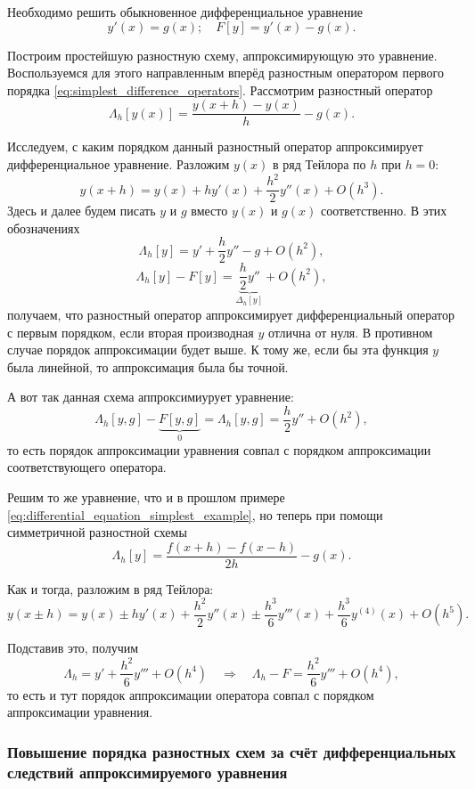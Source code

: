 \documentclass[../main.tex]{subfile}
\begin{document}
\begin{example}\label{eq:differential_equation_simplest_example}
	Необходимо решить обыкновенное дифференциальное уравнение
	\[y'(x)=g(x);\quad F[y]=y'(x)-g(x).\]

	Построим простейшую разностную схему, аппроксимирующую это уравнение.
	Воспользуемся для этого направленным вперёд разностным оператором
	первого порядка \eqref{eq:simplest_difference_operators}. Рассмотрим
	разностный оператор
	\[\Lambda_h[y(x)]=\frac{y(x+h)-y(x)}{h}-g(x).\]

	Исследуем, с каким порядком данный разностный оператор аппроксимирует
	дифференциальное уравнение. Разложим $y(x)$ в ряд Тейлора по $h$ при
	$h=0$:
	\[y(x+h)=y(x)+hy'(x)+\frac{h^2}{2}y''(x)+O(h^3).\]
	Здесь и далее будем писать $y$ и $g$ вместо $y(x)$ и $g(x)$
	соответственно. В этих обозначениях
	\[\Lambda_h[y]=y'+\frac{h}{2}y''-g+O(h^2),\]
	\[\Lambda_h[y]-F[y]=\underset{\Delta_h[y]}{\underbrace{\frac{h}{2}y''}}
	+O(h^2),\]
	получаем, что разностный оператор аппроксимирует дифференциальный
	оператор с первым порядком, если вторая производная $y$ отлична от нуля.
	В противном случае порядок аппроксимации будет выше. К тому же, если бы
	эта функция $y$ была линейной, то аппроксимация была бы точной.

	А вот так данная схема аппроксимиурует уравнение:
	\[\Lambda_h[y,g]-\underset{0}{\underbrace{F[y,g]}}=\Lambda_h[y,g]=
	\frac{h}{2}y''+O(h^2),\]
	то есть порядок аппроксимации уравнения совпал с порядком аппроксимации
	соответствующего оператора.
\end{example}

\begin{example}\label{eq:differential_equation_central_example}
	Решим то же уравнение, что и в прошлом примере
	\eqref{eq:differential_equation_simplest_example}, но теперь при помощи
	симметричной разностной схемы
	\[\Lambda_h[y]=\frac{f(x+h)-f(x-h)}{2h}-g(x).\]

	Как и тогда, разложим в ряд Тейлора:
	\[y(x\pm h)=y(x)\pm hy'(x)+\frac{h^2}{2}y''(x)\pm\frac{h^3}{6}y'''(x)+
	\frac{h^3}{6}y^{(4)}(x)+O(h^5).\]

	Подставив это, получим
	\[\Lambda_h=y'+\frac{h^2}{6}y'''+O(h^4)\quad\Rightarrow\quad
	\Lambda_h-F=\frac{h^2}{6}y'''+O(h^4),\]
	то есть и тут порядок аппроксимации оператора совпал с порядком
	аппроксимации уравнения.
\end{example}

\subsubsection{Повышение порядка разностных схем за счёт дифференциальных
следствий аппроксимируемого уравнения}
\end{document}
